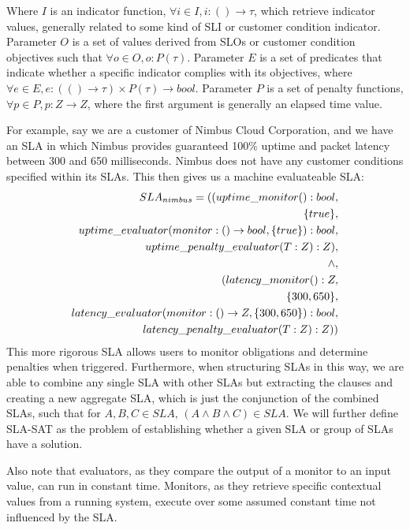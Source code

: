 \documentclass[a4paper,twoside]{article}
\begin{document}
Where $ I $ is an indicator function, $ \forall i \in I, i : () \rightarrow \tau $, which retrieve indicator values, generally related to some kind of SLI or customer condition indicator.  Parameter $ O $ is a set of values derived from SLOs or customer condition objectives such that $ \forall o \in O, o : P(\tau) $.  Parameter $ E $ is a set of predicates that indicate whether a specific indicator complies with its objectives, where $ \forall e \in E, e : ( () \rightarrow \tau ) \times P(\tau) \rightarrow bool $.  Parameter $ P $ is a set of penalty functions, $ \forall p \in P, p : Z \rightarrow Z $, where the first argument is generally an elapsed time value.

For example, say we are a customer of Nimbus Cloud Corporation, and we have an SLA in which Nimbus provides guaranteed 100\% uptime and packet latency between 300 and 650 milliseconds.  Nimbus does not have any customer conditions specified within its SLAs.  This then gives us a machine evaluateable SLA:
\begin{align}
SLA_{nimbus} = ( ( uptime\_monitor() : bool, \notag\\
\lbrace true \rbrace, \notag \\
uptime\_evaluator( monitor : () \rightarrow bool, \lbrace true \rbrace) : bool, \notag \\
uptime\_penalty\_evaluator( T : Z ) : Z ), \notag \\
\land, \notag \\
( latency\_monitor() : Z, \notag \\
\lbrace 300, 650 \rbrace, \notag \\
latency\_evaluator( monitor : () \rightarrow Z, \lbrace 300, 650 \rbrace) : bool, \notag \\
latency\_penalty\_evaluator( T : Z ) : Z) ) \notag
\end{align}
This more rigorous SLA allows users to monitor obligations and determine penalties when triggered.  Furthermore, when structuring SLAs in this way, we are able to combine any single SLA with other SLAs but extracting the clauses and creating a new aggregate SLA, which is just the conjunction of the combined SLAs, such that for $ A, B, C \in SLA $, $ ( A \land B \land C ) \in SLA $.  We will further define SLA-SAT as the problem of establishing whether a given SLA or group of SLAs have a solution.

Also note that evaluators, as they compare the output of a monitor to an input value, can run in constant time.  Monitors, as they retrieve specific contextual values from a running system, execute over some assumed constant time not influenced by the SLA.
\end{document}
